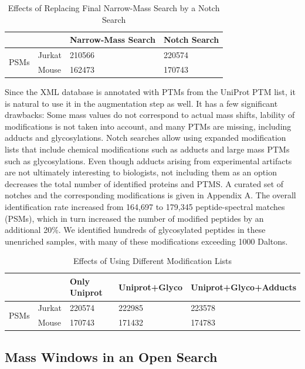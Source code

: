\documentclass[journal=jprobs,manuscript=article]{achemso}
\begin{document}
\begin{table}[]
\centering
\caption{Effects of Replacing Final Narrow-Mass Search by a Notch Search}
\label{tab:table2}
\begin{tabular}{ll|l|l}
                      &        & Narrow-Mass Search & Notch Search\\
\hline
\multirow{2}{*}{PSMs} & Jurkat  & 210566   &  220574  \\
                      & Mouse    & 162473   &   170743
\end{tabular}
\end{table}

Since the XML database is annotated with PTMs from the UniProt PTM list, it is natural to use it in the augmentation step as well.
It has a few significant drawbacks: Some mass values do not correspond to actual mass shifts, lability of modifications is not taken into account, and many PTMs are missing, including adducts and glycosylations.
Notch searches allow using expanded modification lists that include chemical modifications such as adducts and large mass PTMs such as glycosylations.
Even though adducts arising from experimental artifacts are not ultimately interesting to biologists, not including them as an option decreases the total number of identified proteins and PTMS.
A curated set of notches and the corresponding modifications is given in Appendix A.
The overall identification rate increased from 164,697 to 179,345 peptide-spectral matches (PSMs), which in turn increased the number of modified peptides by an additional 20\%.
We identified hundreds of glycosylated peptides in these unenriched samples, with many of these modifications exceeding 1000 Daltons. 

\begin{table}[]
\centering
\caption{Effects of Using Different Modification Lists}
\label{tab:table3}
\begin{tabular}{ll|l|l|l}
                      &        & Only Uniprot & Uniprot+Glyco & Uniprot+Glyco+Adducts\\
\hline
\multirow{2}{*}{PSMs} & Jurkat  & 220574   &  222985 & 223578\\
                      & Mouse    & 170743   &   171432& 174783 
\end{tabular}
\end{table}


\subsection{Mass Windows in an Open Search}
\end{document}

